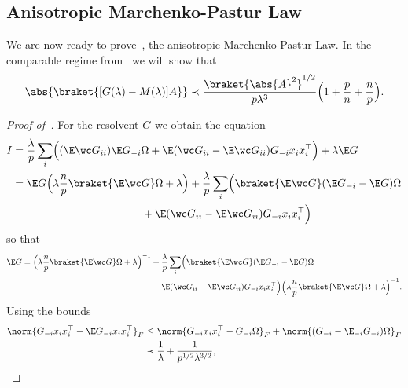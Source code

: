 \subsection*{Anisotropic Marchenko-Pastur Law}
We are now ready to prove~, the anisotropic Marchenko-Pastur Law. In the comparable regime from~ we will show that 
\begin{equation}\label{eq MP comp}
    \abs{\braket{[G(\lambda)-M(\lambda)]A}}\prec\frac{\braket{\abs{A}^2}^{1/2}}{p\lambda^3} \Bigl(1+\frac{p}{n}+\frac{n}{p}\Bigr).
\end{equation}
\begin{proof}[Proof of~]
For the resolvent $G$ we obtain the equation
\begin{equation}
    \begin{aligned}
        I &= \frac{\lambda}{p}\sum_i \Bigl( (\E \wc G_{ii}) \E G_{-i} \Omega + \E (\wc G_{ii}-\E \wc G_{ii}) G_{-i} x_i x_i^\top\Bigr) + \lambda \E G \\
        &=  \E G \Bigl(\lambda\frac{n}{p}\braket{\E\wc G}  \Omega + \lambda\Bigr) + \frac{\lambda}{p} \sum_i \Bigl(\braket{\E \wc G} (\E G_{-i}-\E G) \Omega  \\
        &\qquad \qquad \qquad \qquad \qquad \qquad  + \E( \wc G_{ii}-\E \wc G_{ii})G_{-i} x_i x_i^\top\Bigr) \\
    \end{aligned}
\end{equation}
so that
\begin{equation}
    \begin{aligned}
    \E G = \Bigl(\lambda\frac{n}{p}\braket{\E\wc G}\Omega + \lambda\Bigr)^{-1} &+ \frac{\lambda}{p} \sum_i \Bigl(\braket{\E \wc G} (\E G_{-i}-\E G) \Omega \\
     &+ \E( \wc G_{ii}-\E \wc G_{ii})G_{-i} x_i x_i^\top\Bigr) \Bigl(\lambda\frac{n}{p}\braket{\E\wc G}\Omega + \lambda\Bigr)^{-1}.
    \end{aligned}
\end{equation}
Using the bounds
\begin{equation}
    \begin{aligned}
    \norm{G_{-i} x_i x_i^\top-\E G_{-i} x_i x_i^\top}_F &\le \norm{G_{-i} x_i x_i^\top - G_{-i}\Omega }_F + \norm{ (G_{-i}- \E_{-i} G_{-i})\Omega}_F \\
    &\prec \frac{1}{\lambda} + \frac{1}{p^{1/2}\lambda^{3/2}},
    \end{aligned}
\end{equation}
\begin{equation}

\end{equation}
\end{proof}
